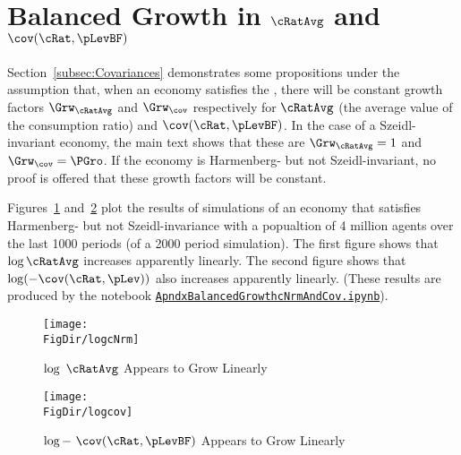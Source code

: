 \documentclass[\econtexRoot/BufferStockTheory]{subfiles}
\begin{document}
\hypertarget{ApndxBalancedGrowthCNrmAndCov}{}
\section{Balanced Growth in $\cRatAvg$ and $\cov(\cRat,\pLevBF)$}\label{sec:ApndxBalancedGrowthCNrmAndCov}


Section~\ref{subsec:Covariances} demonstrates some propositions under the assumption that, when an economy satisfies the {\GIC}, there will be constant growth factors $\Grw_{\cRatAvg}$ and $\Grw_{\cov}$ respectively for $\cRatAvg$ (the average value of the consumption ratio) and $\cov(\cRat,\pLevBF)$.  In the case of a Szeidl-invariant economy, the main text shows that these are $\Grw_{\cRatAvg}=1$ and $\Grw_{\cov}=\PGro$.  If the economy is Harmenberg- but not Szeidl-invariant, no proof is offered that these growth factors will be constant.

Figures~\ref{fig:logcNrm} and~\ref{fig:logcov} plot the results of simulations of an economy that satisfies Harmenberg- but not Szeidl-invariance with a popualtion of 4 million agents over the last 1000 periods (of a 2000 period simulation).  The first figure shows that $\log \cRatAvg$ increases apparently linearly.  The second figure shows that $\log (-\cov(\cRat,\pLev))$ also increases apparently linearly.  (These results are produced by the notebook \href{https://github.com/econ-ark/BufferStockTheory/blob/master/Code/Python/ApndxBalancedGrowthcNrmAndCov.ipynb}{\texttt{ApndxBalancedGrowthcNrmAndCov.ipynb}}).

\pagebreak
\begin{figure}[h]
  \centerline{
    \texttt{[image: \\FigDir/logcNrm]}
  }
  \caption{$\log ~\cRatAvg$ Appears to Grow Linearly}\label{fig:logcNrm}
\end{figure}
\begin{figure}[h]
  \centerline{
    \texttt{[image: \\FigDir/logcov]}
  }
  \caption{$\log -~\cov(\cRat,\pLevBF)$ Appears to Grow Linearly}\label{fig:logcov}
\end{figure}
\end{document}
